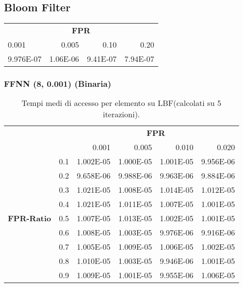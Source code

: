 \documentclass[4apaper,11pt]{report}
\begin{document}
    \subsection{Bloom Filter}

    \begin{table}[H]
        \centering
        \begin{tabular}{lrrr}
        \toprule
        \multicolumn{4}{c}{\textbf{FPR}}\\
        0.001 & 0.005 & 0.10 & 0.20\\
        \midrule 
        9.976E-07 & 1.06E-06 & 9.41E-07 & 7.94E-07\\
        \bottomrule

        \end{tabular}
    \end{table}
    
    \subsubsection{FFNN (8, 0.001) (Binaria)}

    \begin{table}[H]
        \centering
        \begin{tabular}{llrrrr}
        \toprule
        {} & & \multicolumn{4}{c}{\textbf{FPR}}\\
        {} & &    0.001 &     0.005 &     0.010 &     0.020 \\
        \midrule
        \multirow{9}{*}{\textbf{FPR-Ratio}} & 0.1& 1.002E-05 & 1.000E-05 & 1.001E-05 & 9.956E-06 \\
        &0.2& 9.658E-06 & 9.988E-06 & 9.963E-06 & 9.884E-06 \\
        &0.3& 1.021E-05 & 1.008E-05 & 1.014E-05 & 1.012E-05 \\
        &0.4& 1.021E-05 & 1.011E-05 & 1.007E-05 & 1.001E-05 \\
        &0.5& 1.007E-05 & 1.013E-05 & 1.002E-05 & 1.001E-05 \\
        &0.6& 1.008E-05 & 1.003E-05 & 9.976E-06 & 9.916E-06 \\
        &0.7& 1.005E-05 & 1.009E-05 & 1.006E-05 & 1.002E-05 \\
        &0.8& 1.010E-05 & 1.003E-05 & 9.946E-06 & 1.001E-05 \\
        &0.9& 1.009E-05 & 1.001E-05 & 9.955E-06 & 1.006E-05 \\
        \bottomrule
        \end{tabular}
        \caption{Tempi medi di accesso per elemento su LBF(calcolati su 5 iterazioni).}
    \end{table}
\end{document}

